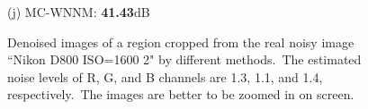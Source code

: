 \documentclass[10pt,onecolumn,letterpaper]{article}
\begin{document}
\begin{figure}[!htbp]
{\begin{minipage}[t]{0.24\textwidth}
{\footnotesize (j) MC-WNNM: \textbf{41.43}dB}
\end{minipage}
}
\caption{Denoised images of a region cropped from the real noisy image ``Nikon D800 ISO=1600 2" \cite{crosschannel2016} by different methods.\ The estimated noise levels of R, G, and B channels are 1.3, 1.1, and 1.4, respectively.\ The images are better to be zoomed in on screen.}
\label{f13}
\end{figure}


\begin{figure}[!htbp]
\centering
{}
\end{figure}
\end{document}
